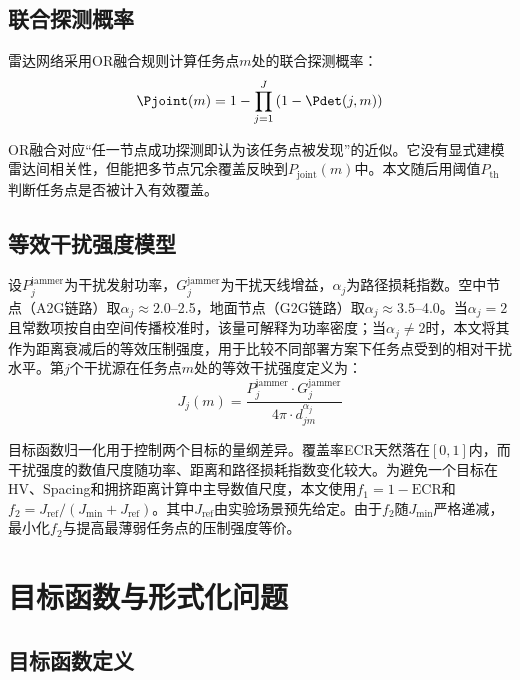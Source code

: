 \subsection{联合探测概率}

雷达网络采用OR融合规则计算任务点$m$处的联合探测概率：
\vspace{-0.5\baselineskip}
\begin{equation}
\Pjoint(m) = 1 - \prod_{j=1}^{J} \left(1 - \Pdet(j, m)\right)
\label{eq:joint_prob}
\end{equation}
\vspace{-1.3\baselineskip}

OR融合对应“任一节点成功探测即认为该任务点被发现”的近似。它没有显式建模雷达间相关性，但能把多节点冗余覆盖反映到$P_{\text{joint}}(m)$中。本文随后用阈值$P_{\text{th}}$判断任务点是否被计入有效覆盖。

\subsection{等效干扰强度模型}

设$P_j^{\text{jammer}}$为干扰发射功率，$G_j^{\text{jammer}}$为干扰天线增益，$\alpha_j$为路径损耗指数。空中节点（A2G链路）取$\alpha_j \approx 2.0$--2.5，地面节点（G2G链路）取$\alpha_j \approx 3.5$--4.0。当$\alpha_j=2$且常数项按自由空间传播校准时，该量可解释为功率密度；当$\alpha_j\neq 2$时，本文将其作为距离衰减后的等效压制强度，用于比较不同部署方案下任务点受到的相对干扰水平。第$j$个干扰源在任务点$m$处的等效干扰强度定义为：
\begin{equation}
J_j(m) = \frac{P_j^{\text{jammer}} \cdot G_j^{\text{jammer}}}{4\pi \cdot d_{jm}^{\alpha_j}}
\label{eq:jamming}
\end{equation}

目标函数归一化用于控制两个目标的量纲差异。覆盖率ECR天然落在$[0,1]$内，而干扰强度的数值尺度随功率、距离和路径损耗指数变化较大。为避免一个目标在HV、Spacing和拥挤距离计算中主导数值尺度，本文使用$f_1=1-\text{ECR}$和$f_2=J_{\text{ref}}/(J_{\min}+J_{\text{ref}})$。其中$J_{\text{ref}}$由实验场景预先给定。由于$f_2$随$J_{\min}$严格递减，最小化$f_2$与提高最薄弱任务点的压制强度等价。

\section{目标函数与形式化问题}

\subsection{目标函数定义}

